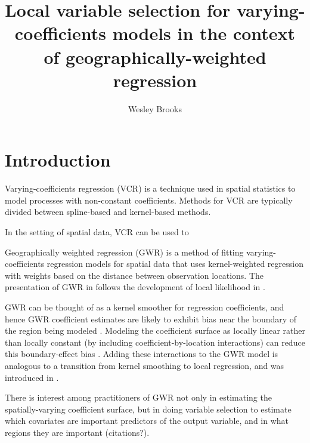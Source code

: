 \documentclass[authoryear, review, 11pt]{elsarticle}
\title{Local variable selection for varying-coefficients models in the context of geographically-weighted regression}
\author{Wesley Brooks}
\date{}                                           %
\begin{document}
\maketitle





\section{Introduction}
	Varying-coefficients regression (VCR) \citep{Hastie:1993a} is a technique used in spatial statistics to model processes with non-constant coefficients. Methods for VCR are typically divided between spline-based \citep{Wood:2006} and kernel-based \citep{Hastie:1993b, Loader:1999} methods. 
	
	In the setting of spatial data, VCR can be used to 
	
	Geographically weighted regression (GWR) \citep{Fotheringham:2002} is a method of fitting varying-coefficients regression models for spatial data that uses kernel-weighted regression with weights based on the distance between observation locations. The presentation of GWR in \cite{Fotheringham:2002} follows the development of local likelihood in \cite{Loader:1999}.
	
	GWR can be thought of as a kernel smoother for regression coefficients, and hence GWR coefficient estimates are likely to exhibit bias near the boundary of the region being modeled \citep{Hastie:1993b}. Modeling the coefficient surface as locally linear rather than locally constant (by including coefficient-by-location interactions) can reduce this boundary-effect bias \citep{Hastie:1993b}. Adding these interactions to the GWR model is analogous to a transition from kernel smoothing to local regression, and was introduced in \cite{Wang:2008b}.
	
	There is interest among practitioners of GWR not only in estimating the spatially-varying coefficient surface, but in doing variable selection to estimate which covariates are important predictors of the output variable, and in what regions they are important (citations?).
	
\end{document}
